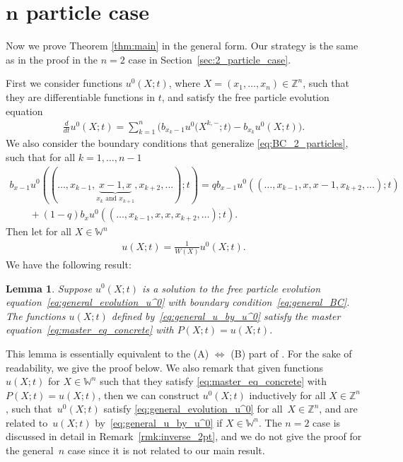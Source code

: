 \documentclass[11pt]{article}
\numberwithin{equation}{section}
\newtheorem{Lemma}[Theorem]{Lemma}
 { \theoremstyle{definition}
\newtheorem{Remark}[Theorem]{Remark} }
\newcommand{\intZ}{\mathbb{Z}}
\newcommand{\Weylchamber}{\mathbb{W}}
\begin{document}
\section[$n$ particle case]{$\boldsymbol{n}$ particle case} \label{sec:n_particle_case}

Now we prove Theorem \ref{thm:main} in the general form. Our strategy is the same as in the proof in the $n = 2$ case in Section~\ref{sec:2_particle_case}.

First we consider functions $u^0(X; t)$, where $X = (x_1, \dotsc, x_n) \in \intZ^n$, such that they are dif\/ferentiable functions in $t$, and satisfy the free particle evolution equation
\begin{gather} \label{eq:general_evolution_u^0}
 \frac{d}{dt} u^0(X; t) = \sum^n_{k = 1} \big( b_{x_k - 1} u^0\big(X^{k, -}; t\big) - b_{x_k} u^0(X; t) \big).
\end{gather}
We also consider the boundary conditions that generalize \eqref{eq:BC_2_particles}, such that for all $k = 1, \dotsc, n - 1$
\begin{gather}
 b_{x - 1} u^0((\dotsc, x_{k - 1}, \underbrace{x - 1, x}_{\text{$x_k$ and $x_{k + 1}$}}, x_{k + 2}, \dotsc); t) = q b_{x - 1} u^0((\dotsc, x_{k - 1}, x, x - 1, x_{k + 2}, \dotsc); t) \nonumber\\
 \qquad{}
+ (1 - q) b_x u^0((\dotsc, x_{k - 1}, x, x, x_{k + 2}, \dotsc); t).\label{eq:general_BC}
\end{gather}
Then let for all $X \in \Weylchamber^n$
\begin{gather} \label{eq:general_u_by_u^0}
 u(X; t) = \frac{1}{W(X)} u^0(X; t).
\end{gather}
We have the following result:
\begin{Lemma} \label{lem:BA_coefficients}
 Suppose $u^0(X; t)$ is a solution to the free particle evolution equation~\eqref{eq:general_evolution_u^0} with boundary condition~\eqref{eq:general_BC}. The functions $u(X; t)$ defined by~\eqref{eq:general_u_by_u^0} satisfy the master equation~\eqref{eq:master_eq_concrete} with $P(X; t) = u(X; t)$.
\end{Lemma}

This lemma is essentially equivalent to the (A) $\Leftrightarrow$ (B) part of \cite[Proposition 2.7]{Borodin-Corwin-Sasamoto14}. For the sake of readability, we give the proof below. We also remark that given functions $u(X; t)$ for $X \in \Weylchamber^n$ such that they satisfy \eqref{eq:master_eq_concrete} with $P(X; t) = u(X; t)$, then we can construct $u^0(X; t)$ inductively for all $X \in \intZ^n$, such that~$u^0(X; t)$ satisfy \eqref{eq:general_evolution_u^0} for all~$X \in \intZ^n$, and are related to~$u(X; t)$ by~\eqref{eq:general_u_by_u^0} if $X \in \Weylchamber^n$. The $n = 2$ case is discussed in detail in Remark~\ref{rmk:inverse_2pt}, and we do not give the proof for the general~$n$ case since it is not related to our main result.
\end{document}
